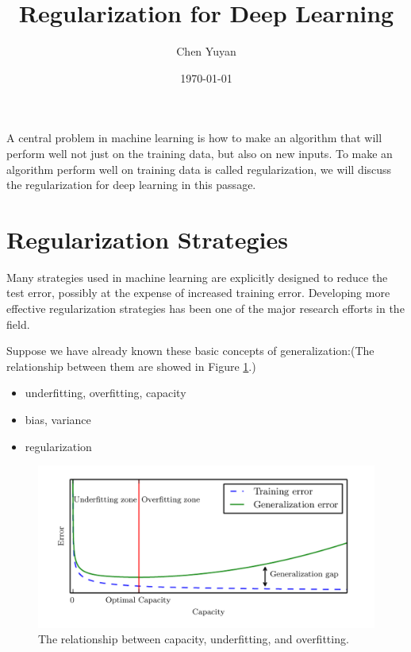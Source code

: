 \documentclass{article}
\title{Regularization for Deep Learning}
\author{Chen Yuyan}
\date{\today}
\begin{document}
 
	\maketitle
	A central problem in machine learning is how to make an algorithm that will
	perform well not just on the training data, but also on new inputs. To make an algorithm perform well on training data is called regularization, we will discuss the regularization for deep learning in this passage.
	\section{Regularization Strategies}
	 Many strategies used in machine learning are explicitly designed to reduce the test error, possibly at the expense of increased training error. Developing more effective regularization strategies has been one of the major research efforts in the field.
	
	Suppose we have already known these basic concepts of generalization:(The relationship between them are showed in Figure \ref{1}.)
	\begin{itemize}
		\item underfitting, overfitting, capacity
		\item bias, variance 
		\item regularization
	\end{itemize}

	\begin{figure}\label{1}
	\caption{The relationship between capacity, underfitting, and overfitting.}
	\includegraphics[width=\textwidth]{figures/MachineLearning3}
	\end{figure}
\end{document}
